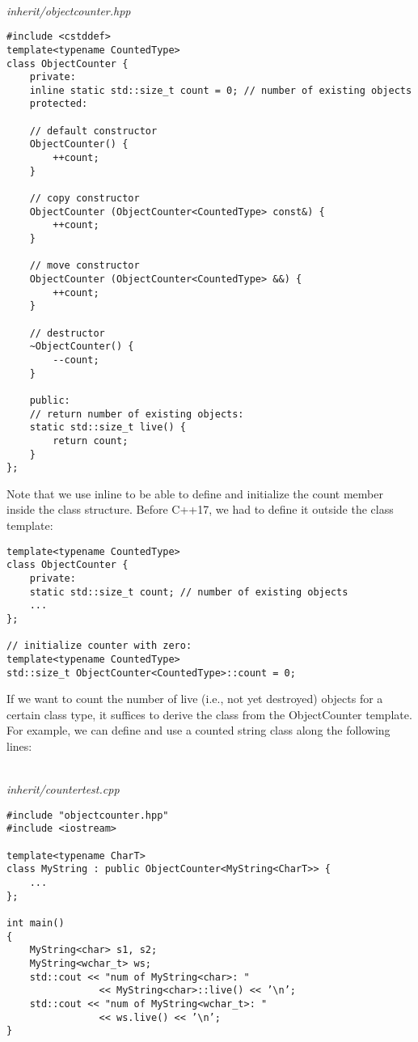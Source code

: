 \hspace*{\fill} \\ %
\noindent
\textit{inherit/objectcounter.hpp}
\begin{lstlisting}[style=styleCXX]
#include <cstddef>
template<typename CountedType>
class ObjectCounter {
	private:
	inline static std::size_t count = 0; // number of existing objects
	protected:
	
	// default constructor
	ObjectCounter() {
		++count;
	}

	// copy constructor
	ObjectCounter (ObjectCounter<CountedType> const&) {
		++count;
	}

	// move constructor
	ObjectCounter (ObjectCounter<CountedType> &&) {
		++count;
	}

	// destructor
	~ObjectCounter() {
		--count;
	}

	public:
	// return number of existing objects:
	static std::size_t live() {
		return count;
	}
};
\end{lstlisting}

Note that we use inline to be able to define and initialize the count member inside the class structure. Before C++17, we had to define it outside the class template:

\begin{lstlisting}[style=styleCXX]
template<typename CountedType>
class ObjectCounter {
	private:
	static std::size_t count; // number of existing objects
	...
};

// initialize counter with zero:
template<typename CountedType>
std::size_t ObjectCounter<CountedType>::count = 0;
\end{lstlisting}

If we want to count the number of live (i.e., not yet destroyed) objects for a certain class type, it suffices to derive the class from the ObjectCounter template. For example, we can define and use a counted string class along the following lines:

\hspace*{\fill} \\ %
\noindent
\textit{inherit/countertest.cpp}
\begin{lstlisting}[style=styleCXX]
#include "objectcounter.hpp"
#include <iostream>

template<typename CharT>
class MyString : public ObjectCounter<MyString<CharT>> {
	...
};

int main()
{
	MyString<char> s1, s2;
	MyString<wchar_t> ws;
	std::cout << "num of MyString<char>: "
				<< MyString<char>::live() << ’\n’;
	std::cout << "num of MyString<wchar_t>: "
				<< ws.live() << ’\n’;
}
\end{lstlisting}

